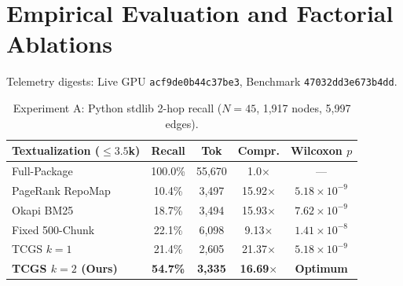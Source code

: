 \documentclass[10pt,twocolumn]{article}
\begin{document}
\section{Empirical Evaluation and Factorial Ablations}
Telemetry digests: Live GPU \texttt{acf9de0b44c37be3}, Benchmark \texttt{47032dd3e673b4dd}.

\begin{table}[h]
\centering
\scriptsize
\begin{tabular}{lcccc}
\toprule
\textbf{Textualization ($\le 3.5$k)} & \textbf{Recall} & \textbf{Tok} & \textbf{Compr.} & \textbf{Wilcoxon $p$} \\
\midrule
Full-Package & 100.0\% & 55,670 & 1.0$\times$ & --- \\
PageRank RepoMap & 10.4\% & 3,497 & 15.92$\times$ & $5.18 \times 10^{-9}$ \\
Okapi BM25 & 18.7\% & 3,494 & 15.93$\times$ & $7.62 \times 10^{-9}$ \\
Fixed 500-Chunk & 22.1\% & 6,098 & 9.13$\times$ & $1.41 \times 10^{-8}$ \\
TCGS $k=1$ & 21.4\% & 2,605 & 21.37$\times$ & $5.18 \times 10^{-9}$ \\
\textbf{TCGS $k=2$ (Ours)} & \textbf{54.7\%} & \textbf{3,335} & \textbf{16.69$\times$} & \textbf{Optimum} \\
\bottomrule
\end{tabular}
\caption{Experiment A: Python stdlib 2-hop recall ($N=45$, 1,917 nodes, 5,997 edges).}
\end{table}
\end{document}
